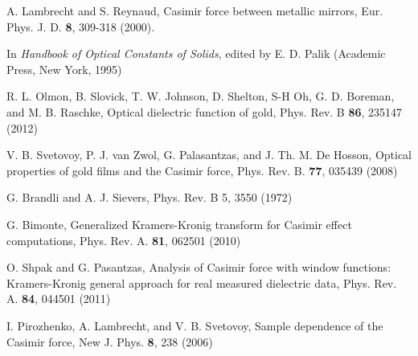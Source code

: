\documentclass[twocolumn,superscriptaddress,pre]{revtex4-1}
\begin{document}
\begin{thebibliography}{99}

A. Lambrecht and S. Reynaud,
Casimir force between metallic mirrors,
Eur. Phys. J. D. \textbf{8}, 309-318 (2000).

In \textit{Handbook of Optical Constants of Solids},
edited by E. D. Palik (Academic Press, New York, 1995)

R. L. Olmon, B. Slovick, T. W. Johnson, D. Shelton, S-H Oh, G. D. Boreman, and M. B. Raschke,
Optical dielectric function of gold,
Phys. Rev. B \textbf{86}, 235147 (2012)

V. B. Svetovoy, P. J. van Zwol, G. Palasantzas, and J. Th. M. De Hosson,
Optical properties of gold films and the Casimir force,
Phys. Rev. B. \textbf{77}, 035439 (2008)

G. Brandli and A. J. Sievers,
Phys. Rev. B 5, 3550 (1972)

G. Bimonte,
Generalized Kramers-Kronig transform for Casimir effect computations,
Phys. Rev. A. \textbf{81}, 062501 (2010)

O. Shpak and G. Pasantzas,
Analysis of Casimir force with window functions: Kramers-Kronig general approach for real measured dielectric data,
Phys. Rev. A. \textbf{84}, 044501 (2011)

I. Pirozhenko, A. Lambrecht, and V. B. Svetovoy,
Sample dependence of the Casimir force,
New J. Phys. \textbf{8}, 238 (2006)

\end{thebibliography}
\end{document}
